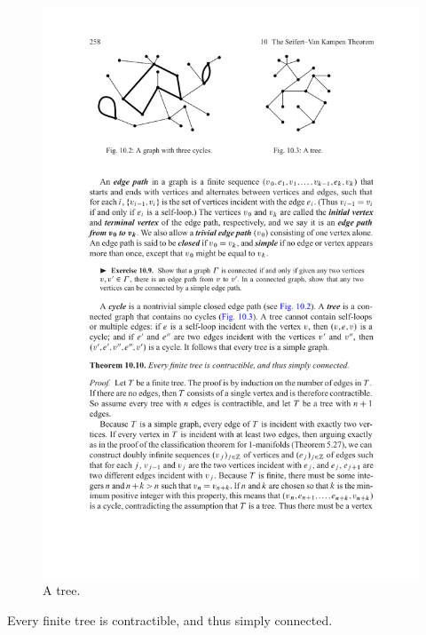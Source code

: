 \begin{figure}[htpb]
\begin{minipage}{200pt}
\centering
\includegraphics{pictures/Graph-eg2}
\caption{A tree.}
\end{minipage}
\end{figure}
\begin{proposition}\label{tree contractible}
Every finite tree is contractible, and thus simply connected.
\end{proposition}

